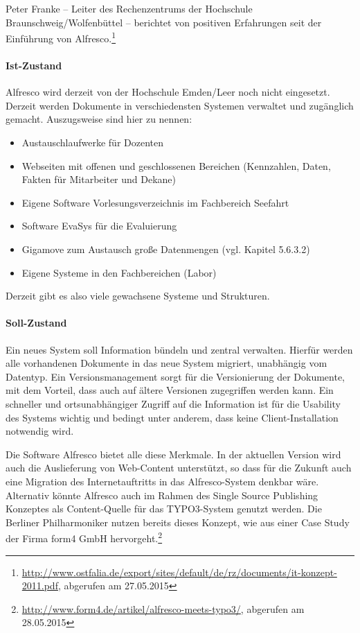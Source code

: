 Peter Franke – Leiter des Rechenzentrums der Hochschule Braunschweig/Wolfenbüttel – berichtet von positiven Erfahrungen seit der Einführung von Alfresco.\footnote{\url{http://www.ostfalia.de/export/sites/default/de/rz/documents/it-konzept-2011.pdf}, abgerufen am 27.05.2015}

\paragraph{Ist-Zustand}
Alfresco wird derzeit von der Hochschule Emden/Leer noch nicht eingesetzt. Derzeit werden Dokumente in verschiedensten Systemen verwaltet und zugänglich gemacht. Auszugsweise sind hier zu nennen:

\begin{itemize}
	\item Austauschlaufwerke für Dozenten
	\item Webseiten mit offenen und geschlossenen Bereichen (Kennzahlen, Daten, Fakten für Mitarbeiter und Dekane)
	\item Eigene Software Vorlesungsverzeichnis im Fachbereich Seefahrt
	\item Software EvaSys für die Evaluierung
	\item Gigamove zum Austausch große Datenmengen (vgl. Kapitel 5.6.3.2)
	\item Eigene Systeme in den Fachbereichen (Labor)	
\end{itemize}

Derzeit gibt es also viele gewachsene Systeme und Strukturen.

\paragraph{Soll-Zustand}
Ein neues System soll Information bündeln und zentral verwalten. Hierfür werden alle vorhandenen Dokumente in das neue System migriert, unabhängig vom Datentyp. Ein Versionsmanagement sorgt für die Versionierung der Dokumente, mit dem Vorteil, dass auch auf ältere Versionen zugegriffen werden kann. Ein schneller und ortsunabhängiger Zugriff auf die Information ist für die Usability des Systems wichtig und bedingt unter anderem, dass keine Client-Installation notwendig wird.

Die Software Alfresco bietet alle diese Merkmale. In der aktuellen Version wird auch die Auslieferung von Web-Content unterstützt, so dass für die Zukunft auch eine Migration des Internetauftritts in das Alfresco-System denkbar wäre. Alternativ könnte Alfresco auch im Rahmen des Single Source Publishing Konzeptes als Content-Quelle für das TYPO3-System genutzt werden. Die Berliner Philharmoniker nutzen bereits dieses Konzept, wie aus einer Case Study der Firma form4 GmbH hervorgeht.\footnote{\url{http://www.form4.de/artikel/alfresco-meets-typo3/}, abgerufen am 28.05.2015}

